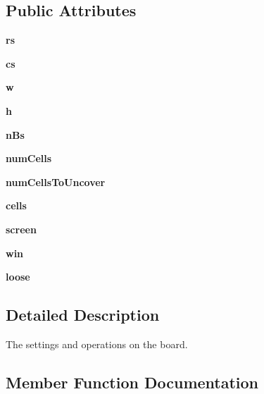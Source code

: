 \subsection*{Public Attributes}
\begin{CompactItemize}
\item 
\textbf{rs}\label{classBoard_1_1Board_112e9bc53c850f947a51f52d0055bbe0}

\item 
\textbf{cs}\label{classBoard_1_1Board_145bd51c1b9b2f8373b04d2546fcd682}

\item 
\textbf{w}\label{classBoard_1_1Board_051e50322711ca2899ff52c309e38b6b}

\item 
\textbf{h}\label{classBoard_1_1Board_2353c23c489634b641eb261a5c709912}

\item 
\textbf{n\-Bs}\label{classBoard_1_1Board_1302e3811eceb54083108b7c71359dcf}

\item 
\textbf{num\-Cells}\label{classBoard_1_1Board_604689b2372b4b1164aa039aab791d6c}

\item 
\textbf{num\-Cells\-To\-Uncover}\label{classBoard_1_1Board_df5edd6525fba25977caf75a0293aa3e}

\item 
\textbf{cells}\label{classBoard_1_1Board_e51656863cc4c1d490092c114aa36f7a}

\item 
\textbf{screen}\label{classBoard_1_1Board_d3d6fa7772fd26c9bdeb9303183adcac}

\item 
\textbf{win}\label{classBoard_1_1Board_d03d1e221f932194d456a309fa983d14}

\item 
\textbf{loose}\label{classBoard_1_1Board_b2add398ce04b153ec61db1099008408}

\end{CompactItemize}


\subsection{Detailed Description}
The settings and operations on the board. 



\subsection{Member Function Documentation}

